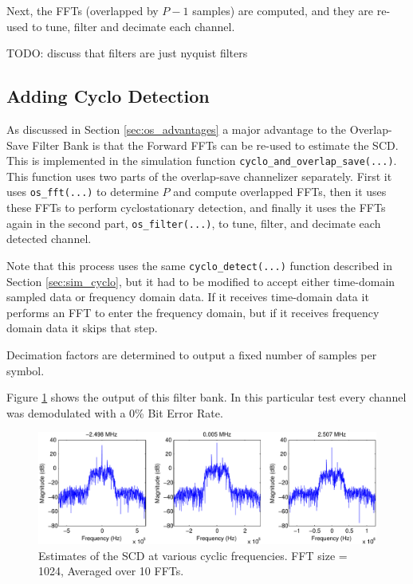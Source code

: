 \documentclass[12pt]{report}
\begin{document}
Next, the FFTs (overlapped by $P-1$ samples) are computed, and they are re-used
to tune, filter and decimate each channel.

TODO: discuss that filters are just nyquist filters

\subsection{Adding Cyclo Detection}
\label{sec:sim_os_cyclo}
As discussed in Section \ref{sec:os_advantages} a major advantage to the
Overlap-Save Filter Bank is that the Forward FFTs can be re-used to estimate
the SCD. This is implemented in the simulation function
\texttt{cyclo\_and\_overlap\_save(...)}. This function uses two parts of the
overlap-save channelizer separately.  First it uses \texttt{os\_fft(...)} to
determine $P$ and compute overlapped FFTs, then it uses these FFTs to perform
cyclostationary detection, and finally it uses the FFTs again in the second part,
\texttt{os\_filter(...)}, to tune, filter, and decimate each detected channel.

Note that this process uses the same \texttt{cyclo\_detect(...)} function 
described in Section \ref{sec:sim_cyclo}, but it had to be modified to accept
either time-domain sampled data or frequency domain data. If it receives
time-domain data it performs an FFT to enter the frequency domain, but if it
receives frequency domain data it skips that step.

Decimation factors are determined to output a fixed number of samples per symbol.

Figure \ref{fig:cyclo_os_results} shows the output of this filter bank. In this
particular test every channel was demodulated with a 0\% Bit Error Rate.

\begin{figure}[bh!]
    \includegraphics[width=\textwidth]{cyclo_os_results}%
\caption{Estimates of the SCD at various cyclic frequencies. FFT size = 1024, Averaged over 10 FFTs.}
\label{fig:cyclo_os_results}
\end{figure}
\end{document}
